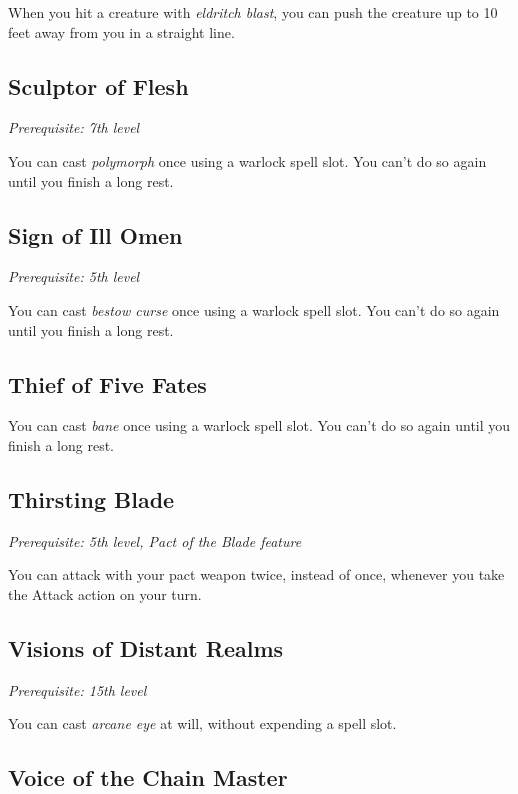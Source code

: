 When you hit a creature with \textit{eldritch blast}, you can push the creature up to 10 feet away from you in a straight line.

\subsection{Sculptor of Flesh}

\textit{Prerequisite: 7th level}

You can cast \textit{polymorph} once using a warlock spell slot. You can't do so again until you finish a long rest.

\subsection{Sign of Ill Omen}

\textit{Prerequisite: 5th level}

You can cast \textit{bestow curse} once using a warlock spell slot. You can't do so again until you finish a long rest.

\subsection{Thief of Five Fates}

You can cast \textit{bane} once using a warlock spell slot. You can't do so again until you finish a long rest.

\subsection{Thirsting Blade}

\textit{Prerequisite: 5th level, Pact of the Blade feature}

You can attack with your pact weapon twice, instead of once, whenever you take the Attack action on your turn.

\subsection{Visions of Distant Realms}

\textit{Prerequisite: 15th level}

You can cast \textit{arcane eye} at will, without expending a spell slot.

\subsection{Voice of the Chain Master}

